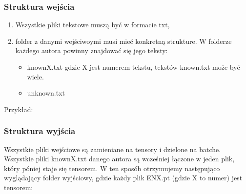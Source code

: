 \subsubsection{Struktura wejścia}

\begin{enumerate}
	\item Wszystkie pliki tekstowe muszą być w formacie txt,
	\item folder z danymi wejściwoymi musi mieć konkretną strukture. W folderze każdego autora
		  powinny znajdować się jego teksty: 
			\begin{itemize}
				\item knownX.txt gdzie X jest numerem tekstu, tekstów known.txt może być wiele.
				\item unknown.txt
			\end{itemize}
\end{enumerate}

Przykład: 

\myspace
{}
\myspace

\newpage
\subsubsection{Struktura wyjścia}

Wszystkie pliki wejściowe są zamieniane na tensory i dzielone na batche. Wszystkie pliki knownX.txt 
danego autora są wcześniej łączone w jeden plik, który póniej staje się tensorem. W ten sposób 
otrzymujemy następująco wyglądający folder wyjściowy, gdzie każdy plik ENX.pt (gdzie X to numer)
 jest tensorem:

\myspace
{}
\myspace
